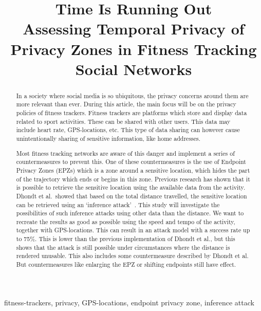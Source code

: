 \documentclass[conference]{IEEEtran}
\begin{document}
\title{\textbf{\LARGE Time Is Running Out\\
        \large Assessing Temporal Privacy of Privacy Zones in Fitness Tracking Social Networks}
}

\author{
}
\maketitle

\begin{abstract}
    In a society where social media is so ubiquitous, the privacy concerns
    around them are more relevant than ever.  During this article, the main
    focus will be on the privacy policies of fitness trackers. Fitness trackers are
    platforms which store and display data related to sport activities. These can
    be shared with other users. This data may include heart rate, GPS-locations,
    etc. This type of data sharing can however cause unintentionally sharing of
    sensitive information, like home addresses.

    Most fitness tracking networks are aware of this danger and implement a series
    of countermeasures to prevent this. One of these countermeasures is the use of
    Endpoint Privacy Zones (EPZs) which is a zone around a sensitive location,
    which hides the part of the trajectory which ends or begins in this zone.
    Previous research has shown that it is possible to retrieve the sensitive
    location using the available data from the activity. Dhondt et al.\ showed that
    based on the total distance travelled, the sensitive location can be retrieved
    using an `inference attack'~\cite{Dhondt}. This study will investigate the
    possibilities of such inference attacks using other data than the distance. We
    want to recreate the results as good as possible using the speed and tempo of
    the activity, together with GPS-locations. This can result in an attack model
    with a success rate up to 75\%. This is lower than the previous implementation
    of Dhondt et al., but this shows that the attack is still possible under
    circumstances where the distance is rendered unusable. This also includes some
    countermeasure described by Dhondt et al. But countermeasures like enlarging
    the EPZ or shifting endpoints still have effect.\vspace{6pt}

\end{abstract}
\begin{IEEEkeywords}
    fitness-trackers, privacy, GPS-locations, endpoint privacy zone, inference attack
\end{IEEEkeywords}
\end{document}
